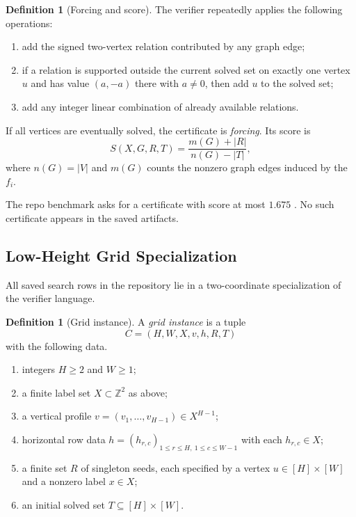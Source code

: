 \documentclass[11pt]{article}
\theoremstyle{definition}
\newtheorem{definition}[theorem]{Definition}
\newcommand{\Z}{\mathbb{Z}}
\begin{document}
\begin{definition}[Forcing and score]
The verifier repeatedly applies the following operations:
\begin{enumerate}
  \item add the signed two-vertex relation contributed by any graph edge;
  \item if a relation is supported outside the current solved set on exactly one vertex $u$ and has value $(a,-a)$ there with $a\neq 0$, then add $u$ to the solved set;
  \item add any integer linear combination of already available relations.
\end{enumerate}
If all vertices are eventually solved, the certificate is \emph{forcing}. Its score is
\[
S(X,G,R,T)=\frac{m(G)+|R|}{n(G)-|T|},
\]
where $n(G)=|V|$ and $m(G)$ counts the nonzero graph edges induced by the $f_i$.
\end{definition}

The repo benchmark asks for a certificate with score at most $1.675$ \citep{epochai2025arithmetickakeya,archivara_phase1_plan}. No such certificate appears in the saved artifacts.

\subsection{Low-Height Grid Specialization}

All saved search rows in the repository lie in a two-coordinate specialization of the verifier language.

\begin{definition}[Grid instance]
\label{def:grid}
A \emph{grid instance} is a tuple
\[
C=(H,W,X,v,h,R,T)
\]
with the following data.
\begin{enumerate}
  \item integers $H\geq 2$ and $W\geq 1$;
  \item a finite label set $X\subset \Z^2$ as above;
  \item a vertical profile $v=(v_1,\dots,v_{H-1})\in X^{H-1}$;
  \item horizontal row data $h=(h_{r,c})_{1\leq r\leq H,\ 1\leq c\leq W-1}$ with each $h_{r,c}\in X$;
  \item a finite set $R$ of singleton seeds, each specified by a vertex $u\in [H]\times[W]$ and a nonzero label $x\in X$;
  \item an initial solved set $T\subseteq [H]\times[W]$.
\end{enumerate}
\end{definition}
\end{document}
